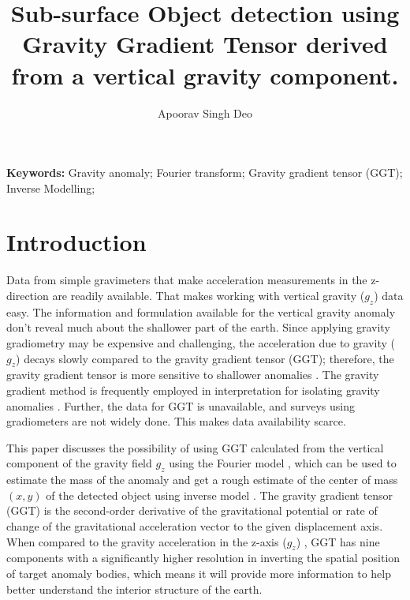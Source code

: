\documentclass[a4paper,11pt]{article}
\author{Apoorav Singh Deo}
\author{}
\title{Sub-surface Object detection using Gravity Gradient Tensor derived from a vertical gravity component.}
\begin{document}
    
\maketitle

\noindent {}

\noindent \textbf{Keywords:} {Gravity anomaly; 
 Fourier transform; Gravity gradient tensor (GGT); Inverse Modelling;}


\section{Introduction}

\noindent Data from simple gravimeters that make acceleration measurements in the z-direction are readily available. That makes working with vertical gravity ($g_z$) data easy. The information and formulation available for the vertical gravity anomaly don't reveal much about the shallower part of the earth. Since applying gravity gradiometry may be expensive and challenging, the acceleration due to gravity ($g_z$) decays slowly compared to the gravity gradient tensor (GGT); therefore, the gravity gradient tensor is more sensitive to shallower anomalies \cite{Paoletti2016}. The gravity gradient method is frequently employed in interpretation for isolating gravity anomalies \cite{murphy2009exploring}. Further, the data for GGT is unavailable, and surveys using gradiometers are not widely done. This makes data availability scarce.\medskip

\noindent This paper discusses the possibility of using GGT calculated from the vertical component of the gravity field $g_{z}$ using the Fourier model \cite{mickus2001complete}, which can be used to estimate the mass of the anomaly and get a rough estimate of the center of mass $(x, y)$ of the detected object using inverse model \cite{tang2017analytical}. The gravity gradient tensor (GGT) is the second-order derivative of the gravitational potential or rate of change of the gravitational acceleration vector to the given displacement axis. When compared to the gravity acceleration in the z-axis ($g_{z}$) \cite{bouman2016satellite}, GGT has nine components with a significantly higher resolution in inverting the spatial position of target anomaly bodies, which means it will provide more information to help better understand the interior structure of the earth\cite{peters2001high}.\medskip
\end{document}
